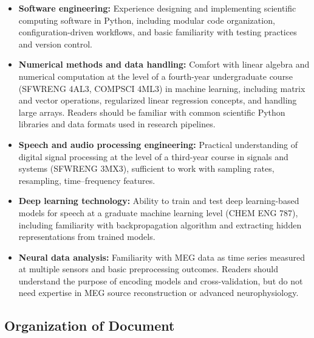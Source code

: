 \documentclass[12pt]{article}
\begin{document}
\begin{itemize}
  \item \textbf{Software engineering:} Experience designing and implementing scientific computing software in Python, including modular code organization, configuration-driven workflows, and basic familiarity with testing practices and version control.

  \item \textbf{Numerical methods and data handling:} Comfort with linear algebra and numerical computation at the level of a fourth-year undergraduate course (SFWRENG 4AL3, COMPSCI 4ML3) in machine learning, including matrix and vector operations, regularized linear regression concepts, and handling large arrays. Readers should be familiar with common scientific Python libraries and data formats used in research pipelines.

  \item \textbf{Speech and audio processing engineering:} Practical understanding of digital signal processing at the level of a third-year course in signals and systems (SFWRENG 3MX3), sufficient to work with sampling rates, resampling, time--frequency features.

  \item \textbf{Deep learning technology:} Ability to train and test deep learning-based models for speech at a graduate machine learning level (CHEM ENG 787), including familiarity with backpropagation algorithm and extracting hidden representations from trained models.

  \item \textbf{Neural data analysis:} Familiarity with MEG data as time series measured at multiple sensors and basic preprocessing outcomes. Readers should understand the purpose of encoding models and cross-validation, but do not need expertise in MEG source reconstruction or advanced neurophysiology.

\end{itemize}














\subsection{Organization of Document}

\end{document}

